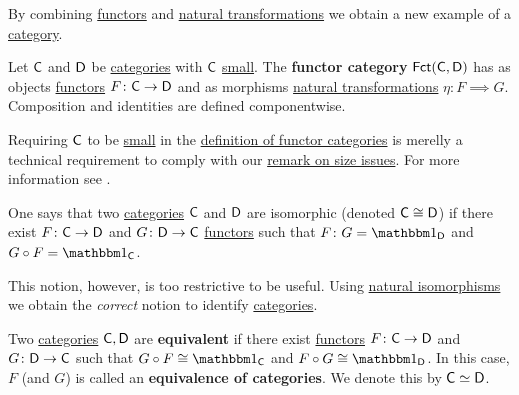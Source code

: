 \documentclass[../../main]{subfiles}
\begin{document}
By combining \hyperref[def:functor]{functors} and \hyperref[def:natural-transformation]{natural transformations} we obtain a new example of a \hyperref[def:category]{category}.
\begin{definition}\label{def:functor-category}
  Let \(\mathsf{C}\) and \(\mathsf{D}\) be \hyperref[def:category]{categories} with \(\mathsf{C}\) \hyperref[def:small-category]{small}. The \textbf{functor category} \(\mathsf{Fct}(\mathsf{C}, \mathsf{D})\) has as objects \hyperref[def:functor]{functors} \(F\colon \mathsf{C} \to \mathsf{D}\) and as morphisms \hyperref[def:natural-transformation]{natural transformations} \(\eta\colon F \implies G\).
  Composition and identities are defined componentwise.
\end{definition}

\begin{remark}
  Requiring \(\mathsf{C}\) to be \hyperref[def:small-category]{small} in the \hyperref[def:functor-category]{definition of functor categories} is merelly a technical requirement to comply with our \hyperref[rem:size-issues]{remark on size issues}.
  For more information see \cite[Remark 1.7.3]{riehlCategoryTheoryContext}.
\end{remark}

One says that two \hyperref[def:category]{categories} \(\mathsf{C}\) and \(\mathsf{D}\) are isomorphic (denoted \(\mathsf{C} \cong \mathsf{D}\)) if there exist \(F\colon \mathsf{C} \to \mathsf{D}\) and \(G\colon \mathsf{D} \to \mathsf{C}\) \hyperref[def:functor]{functors} such that \(F \colon G = \id_{\category{D}}\) and \(G \circ F = \id_{\category{C}}\).

This notion, however, is too restrictive to be useful.
Using \hyperref[def:natural-transformation]{natural isomorphisms} we obtain the \textit{correct} notion to identify \hyperref[def:category]{categories}.
\begin{definition}\label{def:equivalent-categories}
  Two \hyperref[def:category]{categories} \(\mathsf{C}, \mathsf{D}\) are \textbf{equivalent} if there exist \hyperref[def:functor]{functors} \(F\colon \mathsf{C} \to \mathsf{D}\) and \(G\colon \mathsf{D} \to \mathsf{C}\) such that \(G \circ F \cong \id_{\category{C}}\) and \(F \circ G \cong \id_{\category{D}}\). In this case, \(F\) (and \(G\)) is called an \textbf{equivalence of categories}.
  We denote this by \(\mathsf{C} \simeq \mathsf{D}\).
\end{definition}
\end{document}
